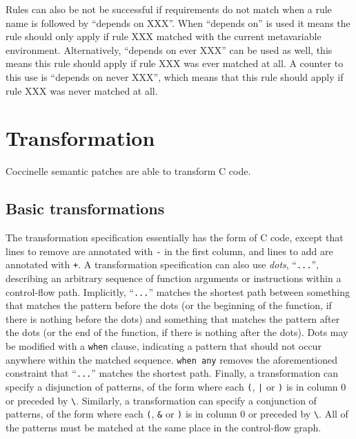 Rules can also be not be successful if requirements do not match
when a rule name is followed by ``depends on XXX''. When ``depends on'' is used
it means the rule should only apply if rule XXX matched with the current
metavariable environment. Alternatively, ``depends on ever XXX'' can be used
as well, this means this rule should apply if rule XXX was ever matched at
all. A counter to this use is ``depends on never XXX'', which means that this
rule should apply if rule XXX was never matched at all.

\section{Transformation}

Coccinelle semantic patches are able to transform C code.

\subsection{Basic transformations}

The transformation specification essentially has the form of C code, except
that lines to remove are annotated with \verb+-+ in the first column, and
lines to add are annotated with \verb-+-.  A transformation specification
can also use {\em dots}, ``\verb-...-'', describing an arbitrary sequence
of function arguments or instructions within a control-flow path.
Implicitly, ``\verb-...-'' matches the shortest path between something that
matches the pattern before the dots (or the beginning of the function, if
there is nothing before the dots) and something that matches the pattern
after the dots (or the end of the function, if there is nothing after the
dots).  Dots may be modified with a {\tt when} clause, indicating a pattern
that should not occur anywhere within the matched sequence.  {\tt when any}
removes the aforementioned constraint that ``\verb-...-'' matches the
shortest path.  Finally, a transformation can specify a disjunction of
patterns, of the form  where each \texttt{(}, \texttt{|} or \texttt{)} is
in column 0 or preceded by \texttt{\textbackslash}.
Similarly, a transformation can specify a conjunction of
patterns, of the form  where each \texttt{(}, \texttt{\&} or \texttt{)} is
in column 0 or preceded by \texttt{\textbackslash}.  All of the patterns
must be matched at the same place in the control-flow graph.

